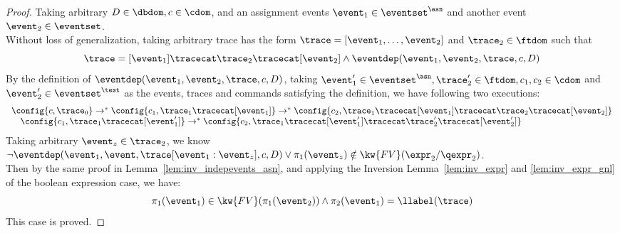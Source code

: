 \begin{proof}
Taking arbitrary $D \in \dbdom , c \in \cdom$, and an assignment events $\event_1 \in \eventset^{\asn}$ and another event 
$\event_2\in \eventset$.
\\
Without loss of generalization, 
taking arbitrary trace has the form $\trace = [\event_1, \ldots, \event_2]$ 
 and $\trace_2 \in \ftdom$ such that
 \[
	\trace = [\event_1] \tracecat \trace_2 \tracecat [\event_2]
	\land
	\eventdep(\event_1, \event_2, \trace, c, D)
	\]
By the definition of $\eventdep(\event_1, \event_2, \trace, c, D)$, 
taking $ \event_1' \in \eventset^{\asn},
\trace_2' \in \ftdom, c_1, c_2 \in \cdom$ and $\event_2' \in \eventset^{\test}$
 as the events, traces and commands satisfying the definition,
 we have following two executions:
%
\[
\begin{array}{l}
\config{c, \trace_0} \rightarrow^{*}
\config{c_1, \trace_1 \tracecat [\event_1]} \rightarrow^{*} \config{c_2, \trace_1 \tracecat [\event_1] \tracecat \trace_2 \tracecat [\event_2]} 
\\ \quad
\config{c_1, \trace_1 \tracecat [\event_1']} \rightarrow^{*} \config{c_2, \trace_1 \tracecat [\event_1'] \tracecat \trace_2' \tracecat [\event_2']} 
\end{array}
\]
%
Taking arbitrary $\event_z \in \trace_2$, we know 
$\neg \eventdep(\event_1, \event, \trace[\event_1:\event_z], c, D)
\lor  \pi_1(\event_z) \notin \kw{FV}(\expr_2 / \qexpr_2)$.
\\
Then by the same proof in Lemma~\ref{lem:inv_indepevents_asn}, and applying the Inversion Lemma~\ref{lem:inv_expr} and \ref{lem:inv_expr_gnl} of the boolean expression case,
we have:
\[ 
	\pi_1(\event_1) \in \kw{FV}(\pi_1(\event_2)) \land {\pi_2(\event_1)} = \llabel(\trace)
	\]
	This case is proved.
\end{proof}


